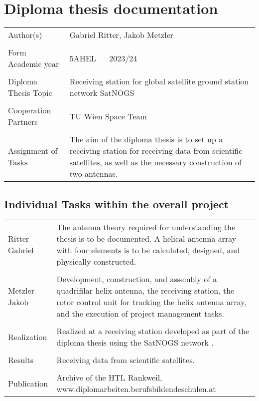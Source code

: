 \section *{Diploma thesis documentation}

\begin{tabular}{@{}p{5cm}p{8cm}}
	Author(s) & Gabriel Ritter, Jakob Metzler\\ & \\
	
	Form ~\textbar~ Academic year & 5AHEL ~\textbar~ 2023/24 \\ & \\
	
	Diploma Thesis Topic & Receiving station for global satellite ground station network SatNOGS \\ & \\
	
	Cooperation Partners & TU Wien Space Team \cite{noauthor_sts1_nodate} \\ & \\
	
	Assignment of Tasks & The aim of the diploma thesis is to set up a receiving station for receiving data from scientific satellites, as well as the necessary construction of two antennas. \\
\end{tabular}

\pagebreak

\subsection *{Individual Tasks within the overall project}
\begin{tabular}{@{}p{5cm}p{8cm}}
	
	Ritter Gabriel & The antenna theory required for understanding the thesis is to be documented. A helical antenna array with four elements is to be calculated, designed, and physically constructed. \\ & \\
	
	Metzler Jakob & Development, construction, and assembly of a quadrifilar helix antenna, the receiving station, the rotor control unit for tracking the helix antenna array, and the execution of project management tasks. \\ & \\
	
	Realization & Realized at a receiving station developed as part of the diploma thesis using the SatNOGS network \cite{noauthor_satnogshomepage_nodate}. \\ & \\
	
	Results & Receiving data from scientific satellites. \\ & \\
	
	Publication & Archive of the HTL Rankweil, \newline  www.diplomarbeiten.berufsbildendeschulen.at \\
\end{tabular}
